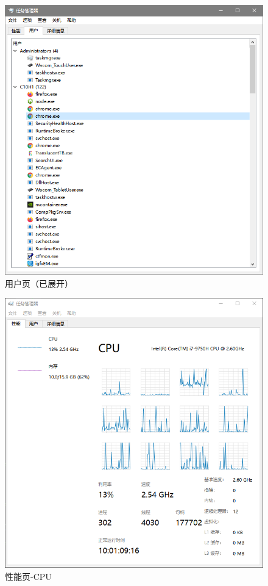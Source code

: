 \documentclass{beamer}
\begin{document}
\begin{frame}
\begin{figure}[htb]
    \centering
    \includegraphics[scale=0.35]{../media/tabs/userTab/usertab expanded.png}
    \caption{用户页（已展开）}
    \label{fig:usertab}
\end{figure}
\end{frame}

\begin{frame}
\begin{figure}[htb]
    \centering
    \includegraphics[scale=0.35]{../media/tabs/perfTab/cpu.png}
    \caption{性能页-CPU}
    \label{fig:perftab}
\end{figure}
\end{frame}
\end{document}
